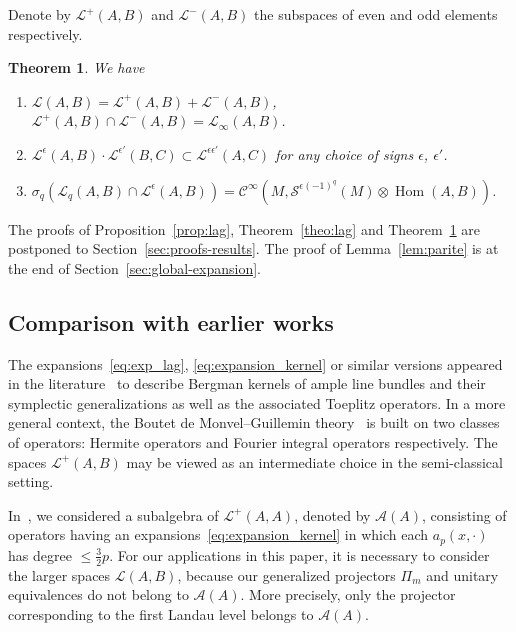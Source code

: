 \documentclass[10pt,a4paper]{article}
\newtheorem{theo}{Theorem}[section]
\theoremstyle{definition}
\numberwithin{equation}{section}
\newcommand{\si}{{\sigma}}
\newcommand{\ep}{\epsilon}
\newcommand{\op}{\operatorname}
\newcommand{\Ci}{{\mathcal{C}}^{\infty}}
\newcommand{\symb}{\mathcal{S}}
\newcommand{\lag}{\mathcal{L}}
\newcommand{\clA}{\mathcal{A}}
\begin{document}
Denote by $\lag^+ (A, B)$ and $\lag^- (A, B)$ the subspaces of even and odd elements respectively.

\begin{theo}\label{theo:parity}
We have
\begin{enumerate}
\item\label{theo2.7.1} $ \lag (A, B) = \lag^+ (A, B) + \lag^- (A, B)$, $\lag^+ (A,B)
\cap \lag ^{-} (A,B) = \lag_{\infty} (A,B)$.
\item\label{theo2.7.2} $\lag ^{\ep} (A,B) \cdot \lag^{\ep'} (B,C) \subset \lag ^{\ep \ep'} (A, C) $ for any choice of signs $\ep$, $\ep'$.
\item\label{theo2.7.3} $\si_q(\lag_q(A,B) \cap \lag^{\ep} (A,B)) = \Ci (M,
\symb^{\ep (-1)^q}(M) \otimes \op{Hom} (A,B))$.
\end{enumerate}
\end{theo}


The proofs of Proposition~\ref{prop:lag}, Theorem~\ref{theo:lag} and Theorem~\ref{theo:parity} are postponed to Section~\ref{sec:proofs-results}. The proof of Lemma~\ref{lem:parite} is at the end of Section~\ref{sec:global-expansion}.


\subsection{Comparison with earlier works}

The expansions~\eqref{eq:exp_lag}, \eqref{eq:expansion_kernel} or similar versions appeared in the literature~\cite{MaMa,oim_op,ShZe} to describe Bergman kernels of ample line bundles and their symplectic generalizations as well as the associated Toeplitz operators. In a more general context, the Boutet de Monvel--Guillemin theory~\cite{BoGu} is built on two classes of operators: Hermite operators and Fourier integral operators respectively. The spaces $\lag^{+} (A,B)$ may be viewed as an intermediate choice in the semi-classical setting.


In~\cite{oim}, we considered a subalgebra of $\lag^{+} (A,A)$, denoted by $\clA(A)$, consisting of operators having an expansions~\eqref{eq:expansion_kernel} in which each $a_p(x,\cdot)$ has degree $\leqslant \frac{3}{2} p$. For our applications in this paper, it is necessary to consider the larger spaces $\lag (A,B)$, because our generalized projectors $\Pi_m$ and unitary equivalences do not belong to $\clA (A)$. More precisely, only the projector corresponding to the first Landau level belongs to $\clA (A)$.
\end{document}
